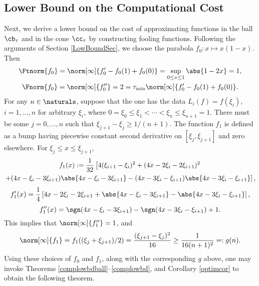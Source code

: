 \subsection{Lower Bound on the Computational Cost}
Next, we derive a lower bound on the cost of approximating functions in the ball $\cb_{\tau}$ and in the cone $\cc_{\tau}$ by constructing fooling functions. Following the arguments of Section \ref{LowBoundSec}, we choose the parabola $f_0: x \mapsto x(1-x)$. Then
\begin{gather*}
\Ftnorm{f_0}=\norm[\infty]{f'_0-f_0(1)+f_0(0)}=\sup_{0 \le x \le 1} \abs{1-2x} = 1, \\ \Fnorm{f_0}=\norm[\infty]{f''_0}=2= \tau_{\min} \norm[\infty]{f'_0-f_0(1)+f_0(0)}.
\end{gather*}
For any $n \in \naturals$, suppose that the one has the data $L_i(f)=f(\xi_i)$, $i=1, \ldots, n$ for arbitrary $\xi_i$, where $0=\xi_0 \le \xi_1 < \cdots < \xi_n \le \xi_{n+1} = 1$.  There must be some $j=0, \ldots, n$ such that $\xi_{j+1} - \xi_j \ge 1/(n+1)$.  The function $f_{1}$ is defined as a bump having piecewise constant second derivative on $[\xi_j, \xi_{j+1}]$ and zero elsewhere.  For $\xi_{j} \le x \leq \xi_{j+1}$,
\begin{multline*}
f_{1}(x):=
\frac{1}{32} \left [4(\xi_{i+1}-\xi_i)^2 + (4x-2\xi_i-2\xi_{i+1})^2  \right. \\
\left. + (4x-\xi_i-3\xi_{i+1})\abs{4x-\xi_i-3\xi_{i+1}} -(4x-3\xi_i-\xi_{i+1})\abs{4x-3\xi_i-\xi_{i+1}} \right],
\end{multline*}
\[
f'_{1}(x)=
\frac{1}{4} \left [4x-2\xi_i-2\xi_{i+1} + \abs{4x-\xi_i-3\xi_{i+1}} -\abs{4x-3\xi_i-\xi_{i+1}} \right],
\]
\[
f''_{1}(x)=\sgn(4x-\xi_i-3\xi_{i+1}) - \sgn(4x-3\xi_i-\xi_{i+1}) + 1.
\]
This implies that $\norm[\infty]{f''_1}=1$, and 
\[
\norm[\infty]{f_1}=f_1((\xi_j+\xi_{j+1})/2)= \frac{(\xi_{j+1} - \xi_j)^2}{16} \ge \frac{1}{16(n+1)^2} =: g(n).
\]
Using these choices of $f_0$ and $f_1$, along with the corresponding $g$ above, one may invoke Theorems \ref{complowbdball}--\ref{complowbd}, and Corollary \ref{optimcor} to obtain the following theorem.

